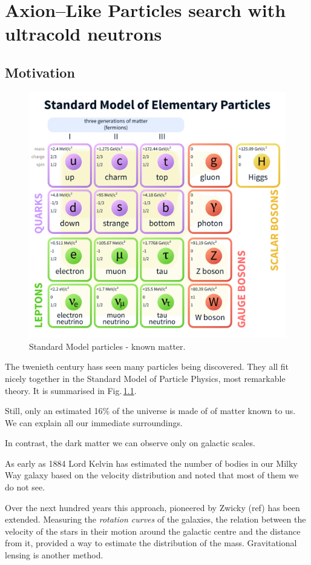 \chapter{Axion--Like Particles search with ultracold neutrons}

\label{ch:axions}

\section{Motivation}
\begin{figure}
  \centering
  \includegraphics[width=0.5\linewidth]{gfx/axions/Standard_Model_of_Elementary_Particles.pdf}
  \caption{Standard Model particles - known matter.}
  \label{fig:axions_SM_particles}
\end{figure}

The twenieth century hass seen many particles being discovered. They all fit nicely together in the Standard Model of Particle Physics, most remarkable theory. It is summarised in Fig.\,\ref{fig:axions_SM_particles}.

Still, only an estimated 16\% of the universe is made of of matter known to us. We can explain all our immediate surroundings.

In contrast, the dark matter we can observe only on galactic scales.

As early as 1884 Lord Kelvin has estimated the number of bodies in our Milky Way galaxy based on the velocity distribution and noted that most of them we do not see.

Over the next hundred years this approach, pioneered by Zwicky (ref) has been extended. Measuring the \emph{rotation curves} of the galaxies, the relation between the velocity of the stars in their motion around the galactic centre and the distance from it, provided a way to estimate the distribution of the mass. Gravitational lensing is another method.

